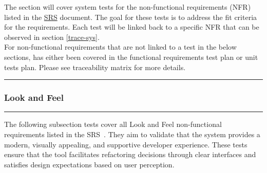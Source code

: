 \documentclass[12pt, titlepage]{article}
\newcommand{\SRS}{\href{https://github.com/ssm-lab/capstone--source-code-optimizer/blob/main/docs/SRS/SRS.pdf}{SRS}}
\newcommand{\colorrule}{\textcolor{BlueViolet}{\rule{\linewidth}{2pt}}}
\begin{document}
The section will cover system tests for the non-functional
requirements (NFR) listed in the \SRS \hspace{1pt}
document\cite{SRS}. The goal for these tests is to address the fit
criteria for the requirements. Each test will be linked back to a
specific NFR that can be observed in section \ref{trace-sys}.\\

\noindent For non-functional requirements that are not linked to a test in the below sections, has either been covered in the functional requirements test plan or unit tests plan. Please see traceability matrix for more details.

\noindent\colorrule

\subsubsection{Look and Feel}
\colorrule

\medskip

\noindent
The following subsection tests cover all Look and Feel non-functional
requirements listed in the SRS~\cite{SRS}. They aim to validate that
the system provides a modern, visually appealing, and supportive
developer experience. These tests ensure that the tool facilitates
refactoring decisions through clear interfaces and satisfies design
expectations based on user perception.
\end{document}
